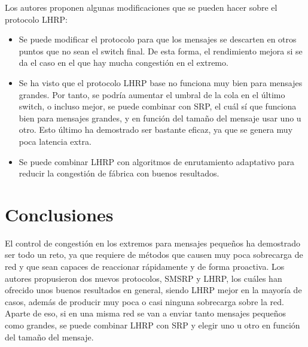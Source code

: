 \documentclass[11pt,a4paper]{article}
\begin{document}
Los autores proponen algunas modificaciones que se pueden hacer sobre el protocolo LHRP:

\begin{itemize}
	\item Se puede modificar el protocolo para que los mensajes se descarten en otros
	puntos que no sean el switch final. De esta forma, el rendimiento mejora si se
	da el caso en el que hay mucha congestión en el extremo.
	\item Se ha visto que el protocolo LHRP base no funciona muy bien para mensajes
	grandes. Por tanto, se podría aumentar el umbral de la cola en el último switch,
	o incluso mejor, se puede combinar con SRP, el cuál sí que funciona bien para mensajes
	grandes, y en función del tamaño del mensaje usar uno u otro. Esto último ha demostrado
	ser bastante eficaz, ya que se genera muy poca latencia extra.
	\item Se puede combinar LHRP con algoritmos de enrutamiento adaptativo para reducir
	la congestión de fábrica con buenos resultados.
\end{itemize}

\section{Conclusiones}

El control de congestión en los extremos para mensajes pequeños ha demostrado ser todo
un reto, ya que requiere de métodos que causen muy poca sobrecarga de red y que sean
capaces de reaccionar rápidamente y de forma proactiva. Los autores propusieron
dos nuevos protocolos, SMSRP y LHRP, los cuáles han ofrecido unos buenos resultados en general,
siendo LHRP mejor en la mayoría de casos, además de producir muy poca o casi ninguna
sobrecarga sobre la red. Aparte de eso, si en una misma red se van a enviar
tanto mensajes pequeños como grandes, se puede combinar LHRP con SRP y elegir uno u otro
en función del tamaño del mensaje.

\newpage

\nocite{*}
\printbibliography[heading=bibintoc]
\end{document}
